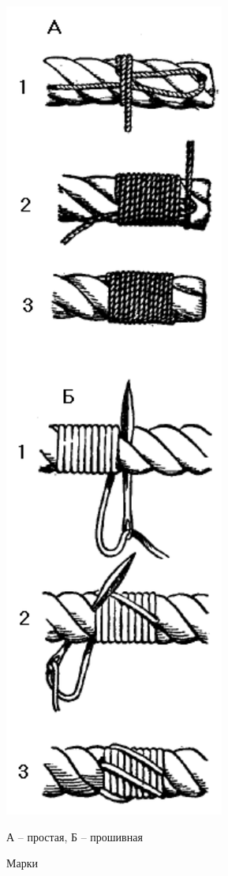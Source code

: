 \documentclass[a4paper, 12pt, twoside, final]{scrbook}
\begin{document}
\begin{figure}
   \centering
   \includegraphics{56_Marki} %
   \caption{Марки}
   \label{fig:56}
   \centering\small
   А \--- простая, Б \--- прошивная
\end{figure}
\end{document}
